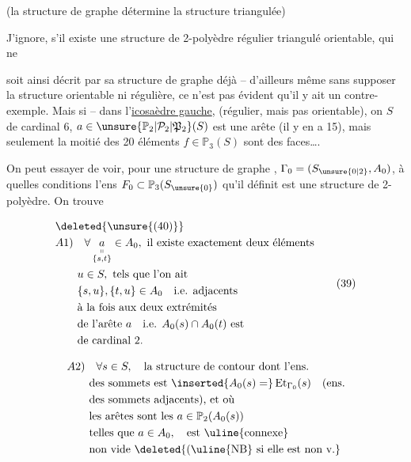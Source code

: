 
(la structure de graphe détermine la structure triangulée)

J'ignore, s'il existe une structure de 2-polyèdre régulier  triangulé orientable, qui ne

soit ainsi décrit par sa structure de graphe déjà -- d'ailleurs même sans supposer la structure orientable ni régulière, ce n'est pas évident qu'il y ait un contre-exemple.  Mais si -- dans l'\uline{icosaèdre gauche}, (régulier, mais pas orientable), on  $S$ de cardinal 6,   $a\in\unsure{\mathbb P_2|\mathcal P_2|\mathfrak P_2}(S)$ est une arête (il y en a 15), mais seulement la moitié des 20 éléments $f\in\mathbb P_3(S)$ sont des faces\ldots.


On peut essayer de voir, pour une structure de graphe , $\Gamma_0=(S_{\unsure{0|2}},A_0)$, à quelles conditions l'ens $F_0\subset\mathbb P_3(S_{\unsure{0}})$ qu'il  définit est une structure de 2-polyèdre. On trouve 

\[
\begin{aligned}
&\deleted{\unsure{(40)}}\\
&A1)\quad \forall\,\underset{\substack{\shortparallel\\\{s,t\}}}{a}\in A_0,\ 
 \text{il existe exactement deux éléments}\\
&\qquad u\in S,\ \text{tels que l'on ait}\\
&\qquad \{s,u\},\{t,u\}\in A_0\quad \text{i.e. adjacents}\\
&\qquad \text{à la fois aux deux extrémités}\\
&\qquad \text{de l'arête }a\quad\text{i.e. }A_0(s)\cap A_0(t)\text{ est}\\
&\qquad \text{de cardinal }2.
\end{aligned}\tag*{$(39)$}
\]


\[
\begin{aligned}
&A2)\quad \forall s\in S,\quad\text{la structure de contour dont l'ens.}\\
&\qquad\text{des sommets est }\inserted{A_0(s)=}\operatorname{Et}_{\Gamma_0}(s)\quad\text{(ens.}\\
&\qquad\text{des sommets adjacents), et où}\\
&\qquad\text{les arêtes sont les } a\in\mathbb P_2(A_0(s))\\
&\qquad\text{telles que }a\in A_0,\quad\text{est \uline{connexe}}\\
&\qquad\text{non vide \deleted{(\uline{NB} si elle est non v.}}
\end{aligned}
\]

